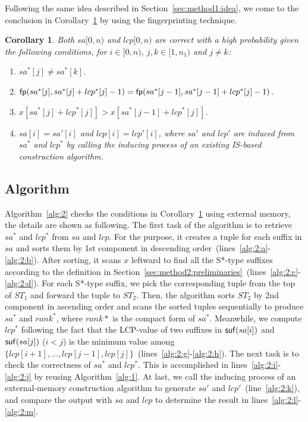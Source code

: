 \documentclass[10pt,journal,compsoc]{IEEEtran}
\newtheorem{Corollary}{Corollary}
\begin{document}
Following the same idea described in Section~\ref{sec:method1:idea}, we come to the conclusion in Corollary~\ref{corollary:2} by using the fingerprinting technique.

\begin{Corollary} \label{corollary:2}
Both $sa[0, n)$ and $lcp[0, n)$ are correct with a high probability given the following conditions, for $i \in [0, n)$, $j, k \in [1, n_1)$ and $j \ne k$:
	
\begin{enumerate}[(1)]
	\item 
	$sa^*[j] \ne sa^*[k]$. 
	\item
	${\sf fp}(sa^*[j], sa^*[j] + lcp^*[j] - 1) = {\sf fp}(sa^*[j - 1], sa^*[j - 1] + lcp^*[j] - 1)$.
	\item
	$x[sa^*[j] + lcp^*[j]] > x[sa^*[j - 1] + lcp^*[j]]$.
	\item 
	$sa[i] = sa'[i]$ and $lcp[i] = lcp'[i]$, where $sa'$ and $lcp'$ are induced from $sa^*$ and $lcp^*$ by calling the inducing process of an existing IS-based construction algorithm.
\end{enumerate}

\end{Corollary}


\subsection{Algorithm} \label{sec:method2:algorithm}
Algorithm~\ref{alg:2} checks the conditions in Corollary~\ref{corollary:2} using external memory, the details are shown as following. The first task of the algorithm is to retrieve $sa^*$ and $lcp^*$ from $sa$ and $lcp$. For the purpose, it creates a tuple for each suffix in $sa$ and sorts them by 1st component in descending order~(lines~\ref{alg:2:a}-\ref{alg:2:b}). After sorting, it scans $x$ leftward to find all the S*-type suffixes according to the definition in Section~\ref{sec:method2:preliminaries}~(lines~\ref{alg:2:c}-\ref{alg:2:d}). For each S*-type suffix, we pick the corresponding tuple from the top of $ST_1$ and forward the tuple to $ST_2$. Then, the algorithm sorts $ST_2$ by 2nd component in ascending order and scans the sorted tuples sequentially to produce $sa^*$ and $rank^*$, where $rank*$ is the compact form of $sa^*$. Meanwhile, we compute $lcp^*$ following the fact that the LCP-value of two suffixes in ${\sf suf}(sa[i])$ and ${\sf suf}(sa[j])$ ($i < j$) is the minimum value among $\{lcp[i + 1], ..., lcp[j - 1], lcp[j]\}$~(lines~\ref{alg:2:g}-\ref{alg:2:h}). The next task is to check the correctness of $sa^*$ and $lcp^*$. This is accomplished in lines~\ref{alg:2:i}-\ref{alg:2:j} by reusing Algorithm~\ref{alg:1}. At last, we call the inducing process of an external-memory construction algorithm to generate $sa'$ and $lcp'$~(line~\ref{alg:2:k}), and compare the output with $sa$ and $lcp$ to determine the result in lines~\ref{alg:2:l}-\ref{alg:2:m}.
\end{document}
